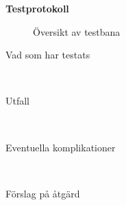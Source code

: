 \documentclass[11pt]{article}
\begin{document}
\begin{center}

{\Huge\bfseries Testprotokoll}
\vspace{5em}
\end{center}

\begin{flushleft}


\begin{figure}[htbp]
\centering
\noindent\resizebox{.4\linewidth}{!}{
	}
	\caption{Översikt av testbana\label{bana}}	
\end{figure}

\begin{description}
\item[Vad som har testats] \hfill \\

\item[Utfall] \hfill \\

\item[Eventuella komplikationer] \hfill \\

\item[Förslag på åtgärd] \hfill \\
\end{description}

\end{flushleft}
\end{document}
